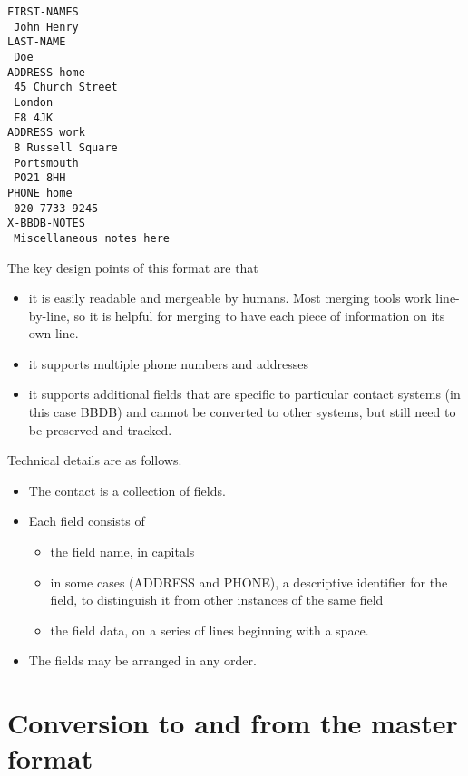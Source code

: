 \documentclass{article}
\begin{document}
\begin{verbatim}
FIRST-NAMES
 John Henry
LAST-NAME
 Doe
ADDRESS home
 45 Church Street
 London
 E8 4JK
ADDRESS work
 8 Russell Square
 Portsmouth
 PO21 8HH
PHONE home
 020 7733 9245
X-BBDB-NOTES
 Miscellaneous notes here
\end{verbatim}

The key design points of this format are that

\begin{itemize}

\item it is easily readable and mergeable by humans.  Most merging
  tools work line-by-line, so it is helpful for merging to have each
  piece of information on its own line.

\item it supports multiple phone numbers and addresses

\item it supports additional fields that are specific to particular
  contact systems (in this case BBDB) and cannot be converted to other
  systems, but still need to be preserved and tracked.

\end{itemize}

Technical details are as follows.

\begin{itemize}

\item The contact is a collection of fields.

\item Each field consists of
  \begin{itemize}
    \item the field name, in capitals
    \item in some cases (ADDRESS and PHONE), a descriptive identifier
      for the field, to distinguish it from other instances of the
      same field
    \item the field data, on a series of lines beginning with a space.
  \end{itemize}

\item The fields may be arranged in any order.

\end{itemize}

\section{Conversion to and from the master format}
\end{document}
